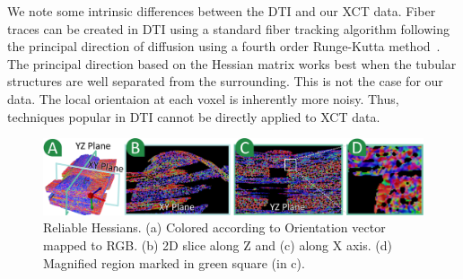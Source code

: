  
We note some intrinsic differences between the DTI and our XCT data. Fiber traces can be created in DTI using a standard fiber tracking algorithm following the principal direction of diffusion using a fourth order Runge-Kutta method~\cite{Brun2003}. The principal direction based on the Hessian matrix works best when the tubular structures are well separated from the surrounding. This is not the case for our data. The local orientaion at each voxel is inherently more noisy. Thus, techniques popular in DTI cannot be directly applied to XCT data.

%
\begin{figure}[tb]
\centering
\includegraphics[width=\linewidth]{images_pvis/reliable_hessian.pdf}
\caption{Reliable Hessians. (a) Colored according to Orientation vector mapped to RGB. (b) 2D slice along Z and (c) along X axis. (d) Magnified region marked in green square (in c).}
\label{fig:reliable_hessian}
\end{figure}


